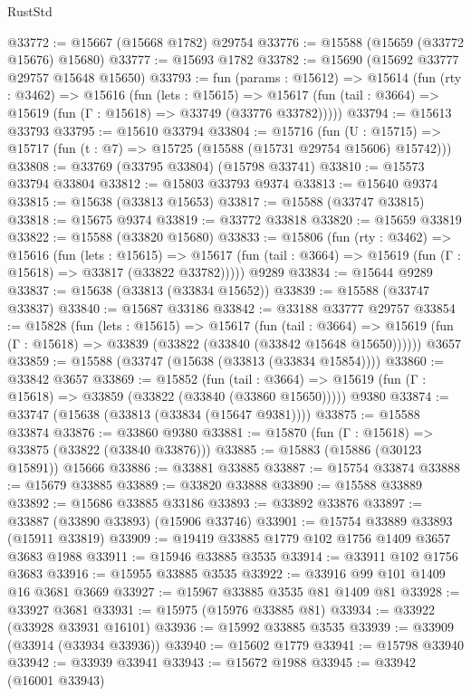 \begin{lexlean}{RustStd}
\begin{coremodule}
@33772 := @15667 (@15668 @1782) @29754
@33776 := @15588 (@15659 (@33772 @15676) @15680)
@33777 := @15693 @1782
@33782 := @15690 (@15692 @33777 @29757 @15648 @15650)
@33793 := fun (params : @15612) =>
  @15614
    (fun (rty : @3462) =>
    @15616
      (fun (lets : @15615) =>
      @15617 (fun (tail : @3664) => @15619 (fun (Γ : @15618) => @33749 (@33776 @33782)))))
@33794 := @15613 @33793
@33795 := @15610 @33794
@33804 := @15716
    (fun (U : @15715) => @15717 (fun (t : @7) => @15725 (@15588 (@15731 @29754 @15606) @15742)))
@33808 := @33769 (@33795 @33804) (@15798 @33741)
@33810 := @15573 @33794 @33804
@33812 := @15803 @33793 @9374
@33813 := @15640 @9374
@33815 := @15638 (@33813 @15653)
@33817 := @15588 (@33747 @33815)
@33818 := @15675 @9374
@33819 := @33772 @33818
@33820 := @15659 @33819
@33822 := @15588 (@33820 @15680)
@33833 := @15806
    (fun (rty : @3462) =>
    @15616
      (fun (lets : @15615) =>
      @15617 (fun (tail : @3664) => @15619 (fun (Γ : @15618) => @33817 (@33822 @33782)))))
    @9289
@33834 := @15644 @9289
@33837 := @15638 (@33813 (@33834 @15652))
@33839 := @15588 (@33747 @33837)
@33840 := @15687 @33186
@33842 := @33188 @33777 @29757
@33854 := @15828
    (fun (lets : @15615) =>
    @15617
      (fun (tail : @3664) =>
      @15619 (fun (Γ : @15618) => @33839 (@33822 (@33840 (@33842 @15648 @15650))))))
    @3657
@33859 := @15588 (@33747 (@15638 (@33813 (@33834 @15854))))
@33860 := @33842 @3657
@33869 := @15852
    (fun (tail : @3664) => @15619 (fun (Γ : @15618) => @33859 (@33822 (@33840 (@33860 @15650)))))
    @9380
@33874 := @33747 (@15638 (@33813 (@33834 (@15647 @9381))))
@33875 := @15588 @33874
@33876 := @33860 @9380
@33881 := @15870 (fun (Γ : @15618) => @33875 (@33822 (@33840 @33876)))
@33885 := @15883 (@15886 (@30123 @15891)) @15666
@33886 := @33881 @33885
@33887 := @15754 @33874
@33888 := @15679 @33885
@33889 := @33820 @33888
@33890 := @15588 @33889
@33892 := @15686 @33885 @33186
@33893 := @33892 @33876
@33897 := @33887 (@33890 @33893) (@15906 @33746)
@33901 := @15754 @33889 @33893 (@15911 @33819)
@33909 := @19419 @33885 @1779 @102 @1756 @1409 @3657 @3683 @1988
@33911 := @15946 @33885 @3535
@33914 := @33911 @102 @1756 @3683
@33916 := @15955 @33885 @3535
@33922 := @33916 @99 @101 @1409 @16 @3681 @3669
@33927 := @15967 @33885 @3535 @81 @1409 @81
@33928 := @33927 @3681
@33931 := @15975 (@15976 @33885 @81)
@33934 := @33922 (@33928 @33931 @16101)
@33936 := @15992 @33885 @3535
@33939 := @33909 (@33914 (@33934 @33936))
@33940 := @15602 @1779
@33941 := @15798 @33940
@33942 := @33939 @33941
@33943 := @15672 @1988
@33945 := @33942 (@16001 @33943)

\end{coremodule}
\end{lexlean}
